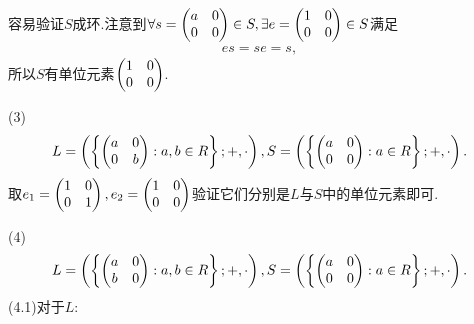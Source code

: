 \begin{solution}
    容易验证$S$成环.注意到$\forall s=\left(\begin{matrix}
        a&0\\
        0&0
    \end{matrix}\right)\in S,\exists e=\left(\begin{matrix}
        1&0\\
        0&0
    \end{matrix}\right)\in S$满足\begin{align*}
        es=se=s,
    \end{align*}所以$S$有单位元素$\left(\begin{matrix}
        1&0\\
        0&0
    \end{matrix}\right)$.

    (3)\begin{align*}
        L=\left(\left\{\left(\begin{matrix}
            a&0\\
            0&b
        \end{matrix}\right):a,b\in\relax{R}\right\};+,\cdot\right),S=\left(\left\{\left(\begin{matrix}
            a&0\\
            0&0
        \end{matrix}\right):a\in\relax{R}\right\};+,\cdot\right).
    \end{align*}取$e_1=\left(\begin{matrix}
        1&0\\
        0&1
    \end{matrix}\right),e_2=\left(\begin{matrix}
        1&0\\
        0&0
    \end{matrix}\right)$验证它们分别是$L$与$S$中的单位元素即可.

    (4)\begin{align*}
        L=\left(\left\{\left(\begin{matrix}
            a&0\\
            b&0
        \end{matrix}\right):a,b\in\relax{R}\right\};+,\cdot\right),S=\left(\left\{\left(\begin{matrix}
            a&0\\
            0&0
        \end{matrix}\right):a\in\relax{R}\right\};+,\cdot\right).
    \end{align*}(4.1)对于$L$:
    

\end{solution}
